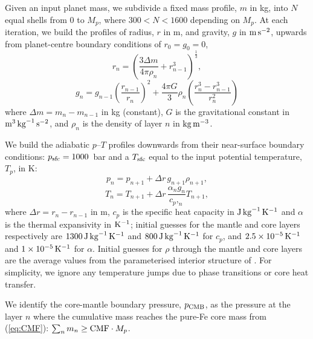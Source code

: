 \documentclass[fleqn,usenatbib]{mnras}
\begin{document}
Given an input planet mass, we subdivide a fixed mass profile, $m$ in kg, into $N$ equal shells from 0 to $M_p$, where $300 < N < 1600$ depending on $M_p$. At each iteration, we build the profiles of radius, $r$ in m, and gravity, $g$ in ${\rm m}\,{\rm s}^{-2}$, upwards from planet-centre boundary conditions of $r_0 = g_0 = 0$, 
\begin{equation}\label{eq:radius_prof}
r_n = \left(\frac{3\Delta m }{4 \pi \rho_n} + r_{n - 1}^3\right)^{\frac{1}{3}},
\end{equation}
\begin{equation}\label{eq:gravity_prof}
g_n = g_{n - 1} \left(\frac{r_{n - 1}}{r_n}\right)^2 + \frac{4 \pi G}{3} \rho_n \left(\frac{r_n^3 - r_{n - 1}^3}{r_n^2}\right)
\end{equation}
where $\Delta m = m_n - m_{n - 1}$ in kg (constant), $G$ is the gravitational constant in ${\rm m}^3 \, {\rm kg}^{-1}\,{\rm s}^{-2}$, and $\rho_n$ is the density of layer $n$ in ${\rm kg} \, {\rm m}^{-3}$.

We build the adiabatic $p$--$T$ profiles downwards from their near-surface boundary conditions: $p_{\rm sfc} = 1000$~bar and a $T_{\rm sfc}$ equal to the input potential temperature, $T_p$, in K:
\begin{equation}\label{eq:pressure_prof}
p_{n} = p_{n + 1} + \Delta r \, g_{n + 1} \rho_{n + 1},
\end{equation}
\begin{equation}\label{eq:temperature_prof}
T_{n} = T_{n + 1} + \Delta r \, \frac{\alpha_{n}g_{n}}{c_p,_{n}} T_{n + 1},
\end{equation}
where $\Delta r = r_n - r_{n - 1}$ in m, $c_p$ is the specific heat capacity in ${\rm J}\,{\rm kg}^{-1}\, {\rm K}^{-1}$ and $\alpha$ is the thermal expansivity in ${\rm K}^{-1}$; initial guesses for the mantle and core layers respectively are $1300\,{\rm J}\,{\rm kg}^{-1}\, {\rm K}^{-1}$ and $800\,{\rm J}\,{\rm kg}^{-1}\, {\rm K}^{-1}$ for $c_p$, and $2.5 \times 10^{-5}\,{\rm K}^{-1}$ and $1 \times 10^{-5}\,{\rm K}^{-1}$ for $\alpha$. Initial guesses for $\rho$ through the mantle and core layers are the average values from the parameterised interior structure of \citet{noack_parameterisations_2020}. For simplicity, we ignore any temperature jumps due to phase transitions or core heat transfer. 

We identify the core-mantle boundary pressure, $p_{\rm CMB}$, as the pressure at the layer $n$ where the cumulative mass reaches the pure-Fe core mass from (\ref{eq:CMF}): $\sum_n m_n \ge {\rm CMF} \cdot M_p$.
\end{document}
